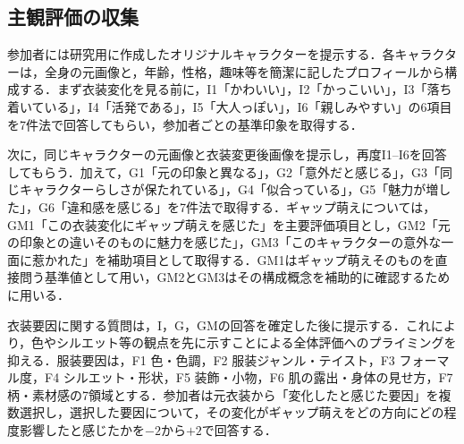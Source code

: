 \documentclass[a4j,twocolumn,11pt]{jarticle}
\begin{document}


\subsection{主観評価の収集}
参加者には研究用に作成したオリジナルキャラクターを提示する．各キャラクターは，全身の元画像と，年齢，性格，趣味等を簡潔に記したプロフィールから構成する．まず衣装変化を見る前に，I1「かわいい」，I2「かっこいい」，I3「落ち着いている」，I4「活発である」，I5「大人っぽい」，I6「親しみやすい」の6項目を7件法で回答してもらい，参加者ごとの基準印象を取得する．

次に，同じキャラクターの元画像と衣装変更後画像を提示し，再度I1--I6を回答してもらう．加えて，G1「元の印象と異なる」，G2「意外だと感じる」，G3「同じキャラクターらしさが保たれている」，G4「似合っている」，G5「魅力が増した」，G6「違和感を感じる」を7件法で取得する．ギャップ萌えについては，GM1「この衣装変化にギャップ萌えを感じた」を主要評価項目とし，GM2「元の印象との違いそのものに魅力を感じた」，GM3「このキャラクターの意外な一面に惹かれた」を補助項目として取得する．GM1はギャップ萌えそのものを直接問う基準値として用い，GM2とGM3はその構成概念を補助的に確認するために用いる．

衣装要因に関する質問は，I，G，GMの回答を確定した後に提示する．これにより，色やシルエット等の観点を先に示すことによる全体評価へのプライミングを抑える．服装要因は，F1 色・色調，F2 服装ジャンル・テイスト，F3 フォーマル度，F4 シルエット・形状，F5 装飾・小物，F6 肌の露出・身体の見せ方，F7 柄・素材感の7領域とする．参加者は元衣装から「変化したと感じた要因」を複数選択し，選択した要因について，その変化がギャップ萌えをどの方向にどの程度影響したと感じたかを$-2$から$+2$で回答する．



\end{document}
